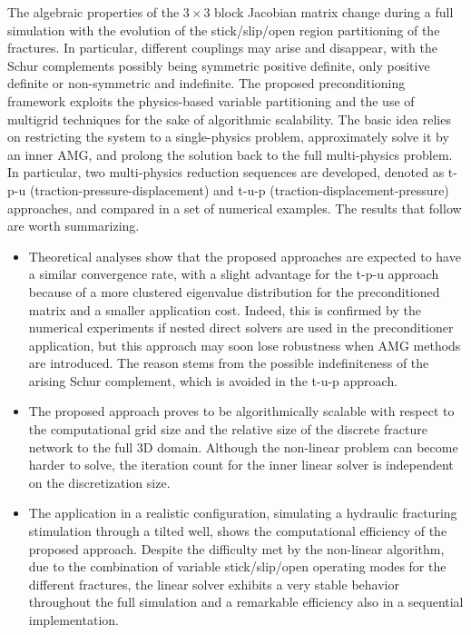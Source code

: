 \documentclass[3p,times]{elsarticle}
\theoremstyle{plain}
\begin{document}
The algebraic properties of the $3\times3$ block Jacobian matrix change during a full simulation with the evolution of the stick/slip/open region partitioning of the fractures. In particular, different couplings may arise and disappear, with the Schur complements possibly being symmetric positive definite, only positive definite or non-symmetric and indefinite.
The proposed preconditioning framework exploits the physics-based variable partitioning and the use of multigrid techniques for the sake of algorithmic scalability.
The basic idea relies on restricting the system to a single-physics problem, approximately solve it by an inner AMG, and prolong the solution back to the full multi-physics problem.
In particular, two multi-physics reduction sequences are developed, denoted as t-p-u (traction-pressure-displacement) and t-u-p (traction-displacement-pressure) approaches, and compared in a set of numerical examples. 
The results that follow are worth summarizing.
\begin{itemize}
    \item Theoretical analyses show that the proposed approaches are expected to have a similar convergence rate, with a slight advantage for the t-p-u approach because of a more clustered eigenvalue distribution for the preconditioned matrix and a smaller application cost. Indeed, this is confirmed by the numerical experiments if nested direct solvers are used in the preconditioner application, but this approach may soon lose robustness when AMG methods are introduced. The reason stems from the possible indefiniteness of the arising Schur complement, which is avoided in the t-u-p approach.
    \item The proposed approach proves to be algorithmically scalable with respect to the computational grid size and the relative size of the discrete fracture network to the full 3D domain. Although the non-linear problem can become harder to solve, the iteration count for the inner linear solver is independent on the discretization size.
    \item The application in a realistic configuration, simulating a hydraulic fracturing stimulation through a tilted well, shows the computational efficiency of the proposed approach. Despite the difficulty met by the non-linear algorithm, due to the combination of variable stick/slip/open operating modes for the different fractures, the linear solver exhibits a very stable behavior throughout the full simulation and a remarkable efficiency also in a sequential implementation.
\end{itemize}
\end{document}
